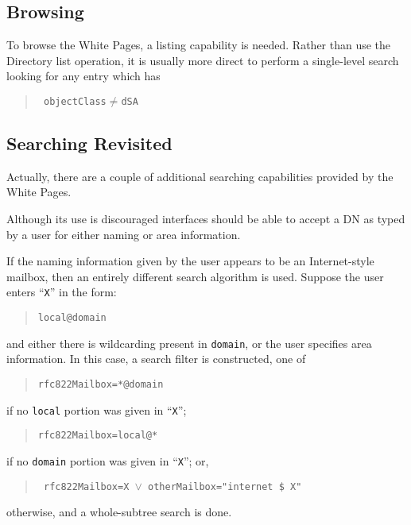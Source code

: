 \subsection	{Browsing}
To browse the White Pages,
a listing capability is needed.
Rather than use the Directory list operation,
it is usually more direct to perform a single-level search looking for any
entry which has
\begin{quote}\small\tt
objectClass$\neq$dSA
\end{quote}

\subsection	{Searching Revisited}
Actually,
there are a couple of additional searching capabilities provided by the White
Pages.

Although its use is discouraged
interfaces should be able to accept a DN as typed by a user for either naming
or area information.

If the naming information given by the user appears to be an Internet-style
mailbox,
then an entirely different search algorithm is used.
Suppose the user enters ``\verb"X"'' in the form:
\begin{quote}\small\begin{verbatim}
local@domain
\end{verbatim}\end{quote}
and either there is wildcarding present in \verb"domain",
or the user specifies area information.
In this case,
a search filter is constructed,
one of
\begin{quote}\small\begin{verbatim}
rfc822Mailbox=*@domain
\end{verbatim}\end{quote}
if no \verb"local" portion was given in ``\verb"X"'';
\begin{quote}\small\begin{verbatim}
rfc822Mailbox=local@*
\end{verbatim}\end{quote}
if no \verb"domain" portion was given in ``\verb"X"'';
or,
\begin{quote}\small\tt
rfc822Mailbox=X $\lor$ otherMailbox="internet \$ X"
\end{quote}
otherwise,
and a whole-subtree search is done.

